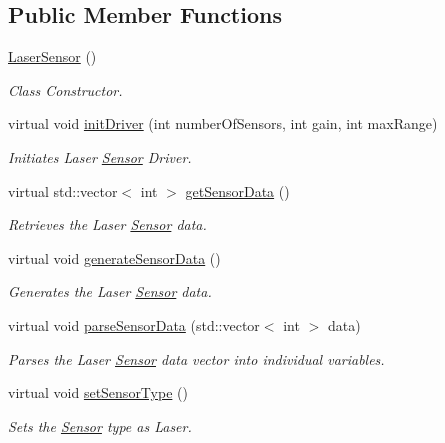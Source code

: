\subsection*{Public Member Functions}
\begin{DoxyCompactItemize}
\item 
\hyperlink{classLaserSensor_a1e40e17c9f636bc41f5612d09480aca4}{Laser\-Sensor} ()
\begin{DoxyCompactList}\small\item\em Class Constructor. \end{DoxyCompactList}\item 
virtual void \hyperlink{classLaserSensor_a1137c622e564b5706e6f36e253c2828b}{init\-Driver} (int number\-Of\-Sensors, int gain, int max\-Range)
\begin{DoxyCompactList}\small\item\em Initiates Laser \hyperlink{classSensor}{Sensor} Driver. \end{DoxyCompactList}\item 
virtual std\-::vector$<$ int $>$ \hyperlink{classLaserSensor_a1660841aa809bc22abc607780bf832b0}{get\-Sensor\-Data} ()
\begin{DoxyCompactList}\small\item\em Retrieves the Laser \hyperlink{classSensor}{Sensor} data. \end{DoxyCompactList}\item 
virtual void \hyperlink{classLaserSensor_a87ed0b803f91e74752a9097c594bcb0a}{generate\-Sensor\-Data} ()
\begin{DoxyCompactList}\small\item\em Generates the Laser \hyperlink{classSensor}{Sensor} data. \end{DoxyCompactList}\item 
virtual void \hyperlink{classLaserSensor_aa2edc4c57398799497859ab9373e9aa5}{parse\-Sensor\-Data} (std\-::vector$<$ int $>$ data)
\begin{DoxyCompactList}\small\item\em Parses the Laser \hyperlink{classSensor}{Sensor} data vector into individual variables. \end{DoxyCompactList}\item 
virtual void \hyperlink{classLaserSensor_ac6b53151004470fc1aba53be913db293}{set\-Sensor\-Type} ()
\begin{DoxyCompactList}\small\item\em Sets the \hyperlink{classSensor}{Sensor} type as Laser. \end{DoxyCompactList}\item 

\end{DoxyCompactItemize}
